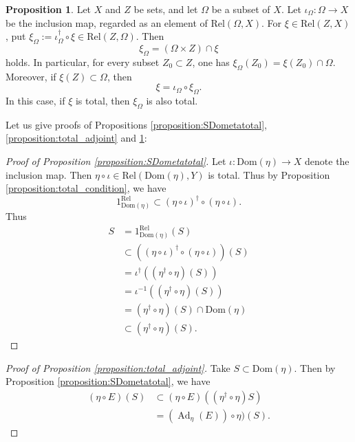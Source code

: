 \documentclass[12pt, a4paper]{amsart}
\theoremstyle{definition}
\newtheorem{proposition}[theorem]{Proposition}
\newcommand{\Ad}{\mathop{\mathrm{Ad}}\nolimits}
\newcommand{\Rel}{\mathrm{Rel}}
\newcommand{\Dom}{\mathrm{Dom}}
\begin{document}
\begin{proposition}\label{proposition:iotaxi_Omega}
Let $X$ and $Z$ be sets, and let $\Omega$ be a subset of $X$.
Let $\iota_\Omega:\Omega\to X$ be the inclusion map, regarded as an element of
$\Rel(\Omega,X)$.
For $\xi\in\Rel(Z,X)$, put
$\xi_\Omega:=\iota_\Omega^\dagger\circ\xi\in\Rel(Z,\Omega)$.
Then 
\[
\xi_\Omega=(\Omega\times Z)\cap\xi
\]
holds.
In particular, for every subset $Z_0\subset Z$, one has
$\xi_{\Omega}(Z_0)=\xi(Z_0)\cap \Omega$.
Moreover, if $\xi(Z)\subset \Omega$, then
\[
\xi=\iota_\Omega \circ\xi_\Omega.
\]
In this case, if $\xi$ is total, then $\xi_\Omega$ is also total.
\end{proposition}

Let us give proofs of Propositions \ref{proposition:SDometatotal}, 
\ref{proposition:total_adjoint} 
and \ref{proposition:iotaxi_Omega}:

\begin{proof}[Proof of Proposition \ref{proposition:SDometatotal}]
Let $\iota : \Dom(\eta) \rightarrow X$ denote the inclusion map.
Then $\eta \circ \iota \in \Rel(\Dom(\eta),Y)$ is total.
Thus by Proposition \ref{proposition:total_condition}, we have \[
1^{\Rel}_{\Dom(\eta)} \subset (\eta \circ \iota)^\dagger \circ (\eta \circ \iota).
\]
Thus 
\begin{align*}
S 
    &= 1^{\Rel}_{\Dom(\eta)}(S) \\
    &\subset ((\eta \circ \iota)^\dagger \circ (\eta \circ \iota))(S) \\
    &= \iota^\dagger((\eta^\dagger \circ \eta)(S)) \\
    &= \iota^{-1}((\eta^\dagger \circ \eta)(S)) \\
    &= (\eta^\dagger \circ \eta)(S) \cap \Dom(\eta) \\
    &\subset (\eta^\dagger \circ \eta)(S).
\end{align*}
\end{proof}

\begin{proof}[Proof of Proposition \ref{proposition:total_adjoint}]
Take $S \subset \Dom(\eta)$.
Then by Proposition \ref{proposition:SDometatotal}, 
we have 
\begin{align*}
(\eta \circ E)(S)
    &\subset (\eta \circ E)((\eta^\dagger \circ \eta)S) \\
    &= (\Ad_{\eta}(E)) \circ \eta)(S).
\end{align*}
\end{proof}
\end{document}
